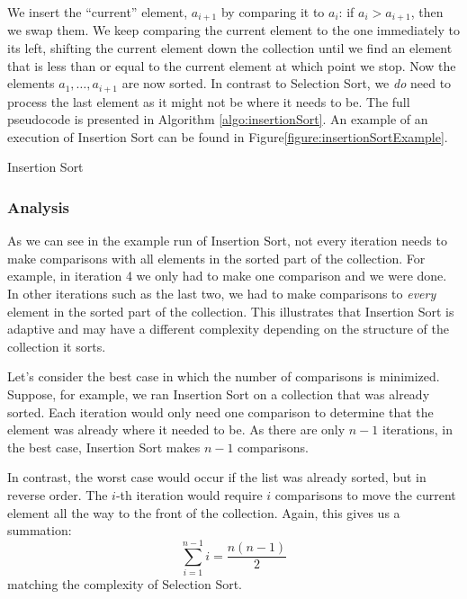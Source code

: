 We insert the ``current'' element, $a_{i+1}$ by comparing it to $a_i$: 
if $a_i > a_{i+1}$, then we swap them.  We keep comparing the current
element to the one immediately to its left, shifting the current element
down the collection until we find an element that is less than or equal 
to the
current element at which point we stop.  Now the elements $a_1, \ldots, a_{i+1}$
are now sorted.  In contrast to Selection Sort, we \emph{do} need to process
the last element as it might not be where it needs to be.  The
full pseudocode is presented in Algorithm \ref{algo:insertionSort}.
An example of an execution of Insertion Sort can be found in Figure\ref{figure:insertionSortExample}.

\begin{algorithm}[H]
\caption{Insertion Sort}
\label{algo:insertionSort}
\end{algorithm}



\subsubsection{Analysis}

As we can see in the example run of Insertion Sort, not every iteration needs
to make comparisons with all elements in the sorted part of the collection.
For example, in iteration 4 we only had to make one comparison and we were done.  In other
iterations such as the last two, we had to make comparisons to \emph{every}
element in the sorted part of the collection.  This illustrates that Insertion
Sort is adaptive and may have a different complexity depending on the structure
of the collection it sorts.

Let's consider the best case in which the number of comparisons is minimized.
Suppose, for example, we ran Insertion Sort on a collection that was already
sorted.  Each iteration would only need one comparison to determine that the
element was already where it needed to be.  As there are only $n-1$ iterations,
in the best case, Insertion Sort makes $n-1$ comparisons.  

In contrast, the worst case would occur if the list was already sorted, but
in reverse order.  The $i$-th iteration would require $i$ comparisons to
move the current element all the way to the front of the collection.  Again, 
this gives us a summation:
$$\sum_{i=1}^{n-1} i = \frac{n(n-1)}{2}$$
matching the complexity of Selection Sort.

